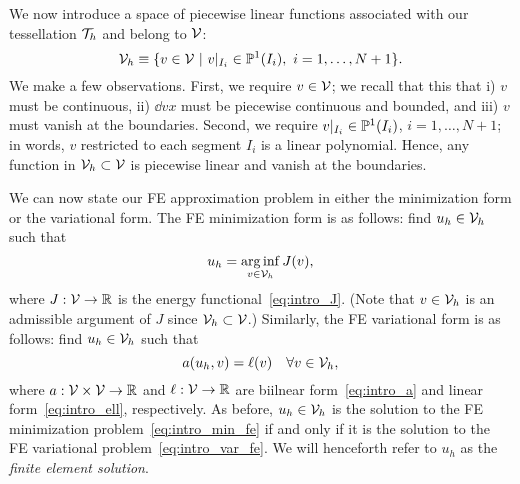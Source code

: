 We now introduce a space of piecewise linear functions associated with our tessellation $\mathcal{T}_h$ and belong to $\mathcal{V}$:
\begin{equation}
  \mathcal{V}_h \equiv \{ v \in \mathcal{V} \ | \ v|_{I_i} \in \mathbb{P}^1(I_i), \ i = 1,\dots,N+1\}.
  \label{eq:intro_Vh}
\end{equation}
We make a few observations.  First, we require $v \in \mathcal{V}$; we recall that this that i) $v$ must be continuous, ii) $\dd{v}{x}$ must be piecewise continuous and bounded, and iii) $v$ must vanish at the boundaries.  Second, we require $v|_{I_i} \in \mathbb{P}^1(I_i)$, $i = 1,\dots,N+1$; in words, $v$ restricted to each segment $I_i$ is a linear polynomial.  Hence, any function in $\mathcal{V}_h \subset \mathcal{V}$ is piecewise linear and vanish at the boundaries.

We can now state our FE approximation problem in either the minimization form or the variational form.  The FE minimization form is as follows: find $u_h \in \mathcal{V}_h$ such that
\begin{equation}
  u_h = \operatorname*{arg\,inf}_{v \in \mathcal{V}_h} J(v),
  \label{eq:intro_min_fe}
\end{equation}
where $J: \mathcal{V} \to \mathbb{R}$ is the energy functional~\eqref{eq:intro_J}. (Note that $v \in \mathcal{V}_h$ is an admissible argument of $J$ since $\mathcal{V}_h \subset \mathcal{V}$.) Similarly, the FE variational form is as follows: find $u_h \in \mathcal{V}_h$ such that
\begin{equation}
  a(u_h,v) = \ell(v) \quad \forall v \in \mathcal{V}_h,
  \label{eq:intro_var_fe}
\end{equation}
where $a: \mathcal{V} \times \mathcal{V} \to \mathbb{R}$ and $\ell: \mathcal{V} \to \mathbb{R}$ are biilnear form~\eqref{eq:intro_a} and linear form~\eqref{eq:intro_ell}, respectively.  As before, $u_h \in \mathcal{V}_h$ is the solution to the FE minimization problem~\eqref{eq:intro_min_fe} if and only if it is the solution to the FE variational problem~\eqref{eq:intro_var_fe}. We will henceforth refer to $u_h$ as the \emph{finite element solution}.

